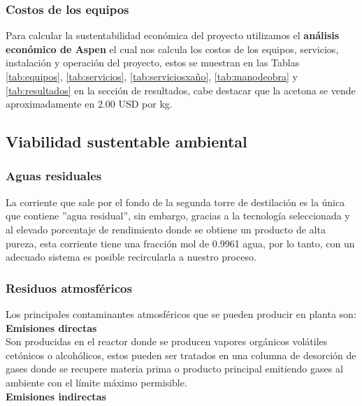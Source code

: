     \subsubsection*{Costos de los equipos}

    Para calcular la sustentabilidad económica del proyecto utilizamos el \textbf{análisis económico de Aspen} el cual nos calcula los costos de los equipos, servicios, instalación y operación del proyecto, estos se muestran en las Tablas \ref{tab:equipos}, \ref{tab:servicios}, \ref{tab:serviciosxaño}, \ref{tab:manodeobra} y \ref{tab:resultados} en la sección de resultados, cabe destacar que la acetona se vende aproximadamente en $2.00$ USD por kg.

    \subsection*{Viabilidad sustentable ambiental}

    \subsubsection*{Aguas residuales}

    La corriente que sale por el fondo de la segunda torre de destilación es la única que contiene ''agua residual'', sin embargo, gracias a la tecnología seleccionada y al elevado porcentaje de rendimiento donde se obtiene un producto de alta pureza, esta corriente tiene una fracción mol de 0.9961 agua, por lo tanto, con un adecuado sistema es posible recircularla a nuestro proceso.

    \subsubsection*{Residuos atmosféricos}

    Los principales contaminantes atmosféricos que se pueden producir en planta son:\\

    \textbf{Emisiones directas}\\

    Son producidas en el reactor donde se producen vapores orgánicos volátiles cetónicos o alcohólicos, estos pueden ser tratados en una columna de desorción de gases donde se recupere materia prima o producto principal emitiendo gases al ambiente con el límite máximo permisible.\\

    \textbf{Emisiones indirectas}\\


